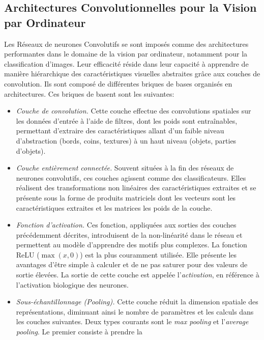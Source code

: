 \subsection*{Architectures Convolutionnelles pour la Vision par Ordinateur}
Les Réseaux de neurones Convolutifs se sont imposés comme des architectures
performantes dans le domaine de la vision par ordinateur, notamment pour la
classification d'images. Leur efficacité réside dans leur capacité à apprendre
de manière hiérarchique des caractéristiques visuelles abstraites grâce aux
couches de convolution. Ils sont composé de différentes briques de bases
organisés en architectures. Ces briques de basent sont les suivantes:\\

\begin{itemize}
  \item \emph{Couche de convolution.} Cette couche effectue des convolutions
        spatiales sur les données d'entrée à l'aide de filtres, dont les poids sont
        entraînables, permettant d'extraire des caractéristiques allant d'un faible
        niveau d'abstraction (bords, coins, textures) à un haut niveau (objets,
        parties d'objets).
  \item \emph{Couche entièrement connectée.} Souvent situées à la fin des
        réseaux de neurones convolutifs, ces couches agissent comme des
        classificateurs. Elles réalisent des transformations non linéaires des
        caractéristiques extraites et se présente sous la forme de produits
        matriciels dont les vecteurs sont les caractéristiques extraites et les
        matrices les poids de la couche.
  \item \emph{Fonction d'activation.} Ces fonction, appliquées aux sorties des
        couches précédemment décrites, introduisent de la non-linéarité dans le
        réseau et permettent au modèle d'apprendre des motifs plus complexes. La
        fonction \ac{ReLU} ($\max(x,0)$) est la plus couramment utilisée. Elle
        présente les avantages d'être simple à calculer et de ne pas saturer
        pour des valeurs de sortie élevées. La sortie de cette couche est
        appelée l'\emph{activation}, en référence à l'activation biologique des
        neurones.
  \item \emph{Sous-échantillonnage (Pooling).} Cette couche réduit la dimension
        spatiale des représentations, diminuant ainsi le nombre de paramètres et les
        calculs dans les couches suivantes. Deux types courants sont le \emph{max
          pooling} et l'\emph{average pooling}. Le premier consiste à prendre la

\end{itemize}
